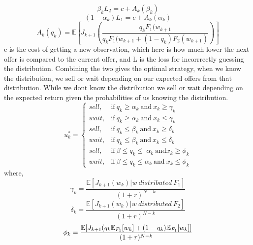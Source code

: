 \documentclass[11pt, oneside]{article}   	%
\begin{document}
$$\beta_{k}L_{2}=c+A_{k}(\beta_{k})$$
$$(1-\alpha_{k})L_{1}=c+A_{k}(\alpha_{k})$$
$$A_{k}(q_{k})=\mathbb{E}[J_{k+1}(\frac{q_{k}F_{1}(w_{k+1}}{q_{k}F_{1}(w_{k+1} + (1-q_{k})F_{2}(w_{k+1})})]$$
c is the cost of getting a new observation, which here is how much lower the next offer is compared to the current offer, and L is the loss for incorrrectly guessing the distribution.
Combining the two gives the optimal strategy, when we know the distribution, we sell or wait depending on our expected offers from that distribution. While we dont know the distribution we sell or wait depending on the expected return given the probabilities of us knowing the distribution.
\begin{equation}
    u^{*}_{k}=
    \begin{cases}
      sell, & \text{if}\ q_{k} \geq \alpha_{k} ~\text{and}~ x_{k} \geq \gamma_{k}\\
      wait, & \text{if}\ q_{k} \geq \alpha_{k}~ \text{and} ~x_{k} \leq \gamma_{k}\\
      sell, & \text{if}\ q_{k} \leq \beta_{k} ~\text{and}~ x_{k} \geq \delta_{k}\\
      wait, & \text{if}\ q_{k} \leq \beta_{k}~ \text{and} ~x_{k} \leq \delta_{k}\\
      sell, & \text{if}\ \beta \leq q_{k} \leq ~\alpha_{k}~ \text{and} x_{k} \geq \phi_{k}  \\
      wait, & \text{if}\ \beta \leq q_{k} \leq \alpha_{k}~ \text{and} ~x_{k} \leq \phi_{k}
    \end{cases}
  \end{equation}
where,
$$
\gamma_{k} = \frac{\mathbb{E}[J_{k+1}(w_{k})| w ~distributed~ F_{1}]}{(1+r)^{N-k}} $$
$$
\delta_{k} = \frac{\mathbb{E}[J_{k+1}(w_{k})| w~distributed~  F_{2}]}{(1+r)^{N-k}} $$
$$
\phi_{k} = \frac{\mathbb{E}[J_{k+1}(q_{k}\mathbb{E}_{F_{1}}[w_{k}]+(1-q_{k})\mathbb{E}_{F_{1}}[w_{k}]]}{(1+r)^{N-k}} \\
$$


\end{document}
